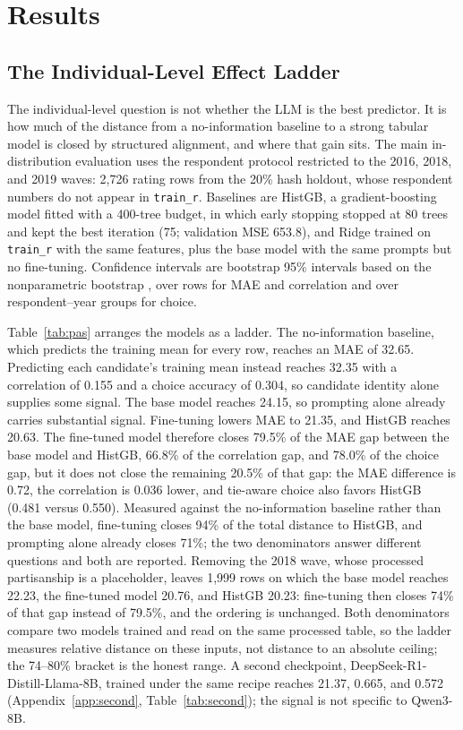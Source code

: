 \chapter{Results}
\label{ch:results}

\section{The Individual-Level Effect Ladder}

The individual-level question is not whether the LLM is the best predictor. It
is how much of the distance from a no-information baseline to a strong tabular
model is closed by structured alignment, and where that gain sits. The main
in-distribution evaluation uses the respondent protocol restricted to the 2016,
2018, and 2019 waves: 2,726 rating rows from the 20\% hash holdout, whose
respondent numbers do not appear in \texttt{train\_r}. Baselines are HistGB, a
gradient-boosting model \citep{friedman2001gbm} fitted with a 400-tree budget, in
which early stopping stopped at 80 trees and kept the best iteration (75;
validation MSE 653.8), and Ridge trained on \texttt{train\_r} with the same features, plus the base model with the same
prompts but no fine-tuning. Confidence intervals are bootstrap 95\% intervals
based on the nonparametric bootstrap \citep{efron1993bootstrap}, over rows for
MAE and correlation and over respondent--year groups for choice.



Table~\ref{tab:pas} arranges the models as a ladder. The no-information
baseline, which predicts the training mean for every row, reaches an MAE of
32.65. Predicting each candidate's training mean instead reaches 32.35 with a
correlation of 0.155 and a choice accuracy of 0.304, so candidate identity alone
supplies some signal. The base model reaches 24.15, so prompting alone already
carries substantial signal. Fine-tuning lowers MAE to 21.35, and HistGB reaches 20.63.
The fine-tuned model therefore closes 79.5\% of the MAE gap between the base model
and HistGB, 66.8\% of the correlation gap, and 78.0\% of the choice gap, but it does
not close the remaining 20.5\% of that gap: the MAE difference is 0.72, the correlation
is 0.036 lower, and tie-aware choice also favors HistGB (0.481 versus 0.550).
Measured against the no-information baseline rather than the base model,
fine-tuning closes 94\% of the total distance to HistGB, and prompting alone
already closes 71\%; the two denominators answer different questions and both
are reported. Removing the 2018 wave, whose processed partisanship is a
placeholder, leaves 1,999 rows on which the base model reaches 22.23, the
fine-tuned model 20.76, and HistGB 20.23: fine-tuning then closes 74\% of that
gap instead of 79.5\%, and the ordering is unchanged. Both denominators compare
two models trained and read on the same processed table, so the ladder measures
relative distance on these inputs, not distance to an absolute ceiling; the
74--80\% bracket is the honest range.
A second checkpoint, DeepSeek-R1-Distill-Llama-8B, trained under the same recipe
reaches 21.37, 0.665, and 0.572 (Appendix~\ref{app:second},
Table~\ref{tab:second}); the signal is not
specific to Qwen3-8B.

